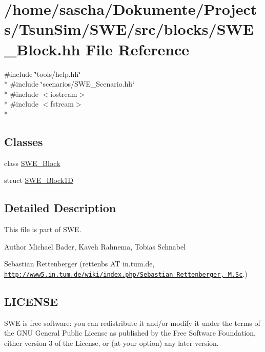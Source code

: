 \hypertarget{SWE__Block_8hh}{\section{/home/sascha/\-Dokumente/\-Projects/\-Tsun\-Sim/\-S\-W\-E/src/blocks/\-S\-W\-E\-\_\-\-Block.hh File Reference}
\label{SWE__Block_8hh}
}
{\ttfamily \#include \char`\"{}tools/help.\-hh\char`\"{}}\\*
{\ttfamily \#include \char`\"{}scenarios/\-S\-W\-E\-\_\-\-Scenario.\-hh\char`\"{}}\\*
{\ttfamily \#include $<$iostream$>$}\\*
{\ttfamily \#include $<$fstream$>$}\\*
\subsection*{Classes}
\begin{DoxyCompactItemize}
\item 
class \hyperlink{classSWE__Block}{S\-W\-E\-\_\-\-Block}
\item 
struct \hyperlink{structSWE__Block1D}{S\-W\-E\-\_\-\-Block1\-D}
\end{DoxyCompactItemize}


\subsection{Detailed Description}
This file is part of S\-W\-E.

\begin{DoxyAuthor}{Author}
Michael Bader, Kaveh Rahnema, Tobias Schnabel 

Sebastian Rettenberger (rettenbs A\-T in.\-tum.\-de, \href{http://www5.in.tum.de/wiki/index.php/Sebastian_Rettenberger,_M.Sc}{\tt http\-://www5.\-in.\-tum.\-de/wiki/index.\-php/\-Sebastian\-\_\-\-Rettenberger,\-\_\-\-M.\-Sc}.)
\end{DoxyAuthor}
\hypertarget{Writer_8hh_LICENSE}{}\subsection{L\-I\-C\-E\-N\-S\-E}\label{Writer_8hh_LICENSE}
S\-W\-E is free software\-: you can redistribute it and/or modify it under the terms of the G\-N\-U General Public License as published by the Free Software Foundation, either version 3 of the License, or (at your option) any later version.


